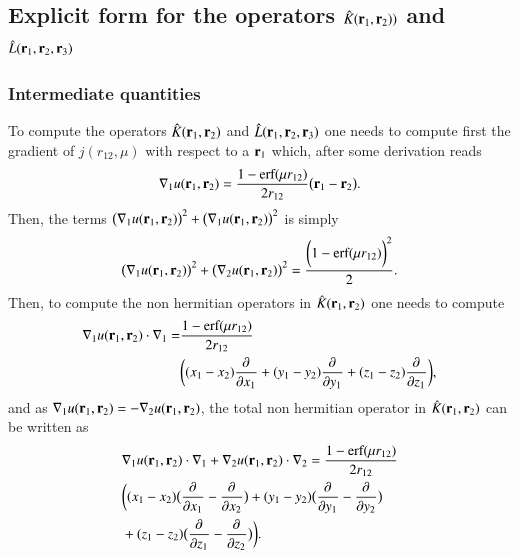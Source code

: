 \documentclass[aip,jcp,reprint,noshowkeys,superscriptaddress]{revtex4-1}
\newcommand{\deriv}[3]{\frac{\partial^{#3} #1}{\partial {#2}^{#3}}}
\newcommand{\br}[0]{{\bf {r}}}
\newcommand{\bri}[1]{{\bf r}_{#1}}
\begin{document}
\subsection{Explicit form for the operators $\hat{K}(\bri{1},\bri{2}) )$ and $\hat{L}(\bri{1},\bri{2},\bri{3})$ }
\subsubsection{Intermediate quantities}
To compute the operators $\hat{K}(\bri{1},\bri{2})$ and $\hat{L}(\bri{1},\bri{2},\bri{3}) $ one needs to compute first the gradient of $j(r_{12},\mu)$ with respect to a $\bri{1}$ which, after some derivation reads 
\begin{equation}
 \label{eq:nabla_u}
 \begin{aligned}
 \nabla_1 u(\br{}_1,\br{}_2) = \frac{1 - \text{erf}(\mu r_{12})}{2 r_{12}} \big( \br{}_1 - \br{}_2 \big).
 \end{aligned}
\end{equation}
Then, the terms $\big(\nabla_1 u(\bri{1},\bri{2}) \big) ^2 + \big(\nabla_1 u(\bri{1},\bri{2}) \big) ^2$ is simply 
\begin{equation}
 \begin{aligned}
 \big(\nabla_1 u(\bri{1},\bri{2}) \big) ^2 + \big(\nabla_2 u(\bri{1},\bri{2}) \big) ^2 = \frac{\bigg(1 - \text{erf}(\mu r_{12}) \bigg)^2}{2}.
 \end{aligned}
\end{equation}
Then, to compute the  non hermitian operators in $\hat{K}(\bri{1},\bri{2})$ one needs to compute 
\begin{equation}
 \begin{aligned}
 \nabla_1 u(\br{}_1,\br{}_2) \cdot \nabla_1  = &\frac{1 - \text{erf}(\mu r_{12})}{2 r_{12}} \\ 
                                          &\bigg( (x_1 - x_2) \deriv{}{x_1}{} + (y_1 - y_2) \deriv{}{y_1}{} + (z_1 - z_2) \deriv{}{z_1}{}\bigg),
 \end{aligned}
\end{equation}
and as $\nabla_1 u(\br{}_1,\br{}_2) = - \nabla_2 u(\br{}_1,\br{}_2)$,   
the total non hermitian operator in $\hat{K}(\bri{1},\bri{2})$ can be written as 
\begin{equation}
 \begin{aligned}
 \label{def_non_hermit}
& \nabla_1 u(\br{}_1,\br{}_2) \cdot \nabla_1 + \nabla_2 u(\br{}_1,\br{}_2) \cdot \nabla_2 = \frac{1 - \text{erf}(\mu r_{12})}{2 r_{12}} \\
& \bigg( (x_1 - x_2) \big( \deriv{}{x_1}{} - \deriv{}{x_2}{} \big) +
         (y_1 - y_2) \big( \deriv{}{y_1}{} - \deriv{}{y_2}{} \big)  \\
&  +      (z_1 - z_2) \big( \deriv{}{z_1}{} - \deriv{}{z_2}{} \big)\bigg).
 \end{aligned}
\end{equation}
\end{document}

